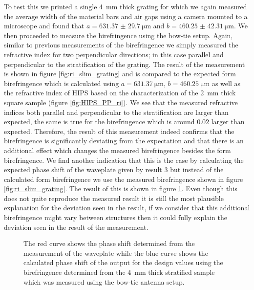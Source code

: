 To test this we printed a single \SI{4}{\milli \meter} thick grating for which we again measured the average width of the material bars and air gaps using a camera mounted to a microscope and found that $a=\SI[separate-uncertainty = true]{631.37(2970)}{\micro \meter}$ and $b=\SI[separate-uncertainty = true]{460.25(4231)}{\micro \meter}$. We then proceeded to measure the birefringence using the bow-tie setup. Again, similar to previous measurements of the birefringence we simply measured the refractive index for two perpendicular directions; in this case parallel and perpendicular to the stratification of the grating. The result of the measurement is shown in figure \ref{fig:ri_slim_grating} and is compared to the expected form birefringence which is calculated using $a=\SI{631.37}{\micro \meter}$, $b=\SI{460.25}{\micro \meter}$ as well as the refractive index of HIPS based on the characterization of the \SI{2}{\milli \meter} thick square sample (figure \ref{fig:HIPS_PP_ri}). We see that the measured refractive indices both parallel and perpendicular to the stratification are larger than expected, the same is true for the birefringence which is around $0.02$ larger than expected. Therefore, the result of this measurement indeed confirms that the birefringence is significantly deviating from the expectation and that there is an additional effect which changes the measured birefringence besides the form birefringence. We find another indication that this is the case by calculating the expected phase shift of the waveplate given by result 3 but instead of the calculated form birefringence we use the measured birefringence shown in figure \ref{fig:ri_slim_grating}. The result of this is shown in figure \ref{fig:delta_gratings_bf}. Even though this does not quite reproduce the measured result it is still the most plausible explanation for the deviation seen in the result, if we consider that this additional birefringence might vary between structures then it could fully explain the deviation seen in the result of the measurement.

\begin{figure}[H]
    \centering
    
    \caption{The red curve shows the phase shift determined from the measurement of the waveplate while the blue curve shows the calculated phase shift of the output for the design values using the birefringence determined from the \SI{4}{\milli \meter} thick stratified sample which was measured using the bow-tie antenna setup.}
    \label{fig:delta_gratings_bf}
\end{figure}

